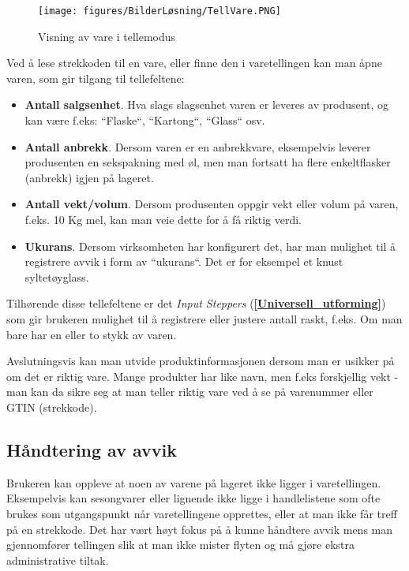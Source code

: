 \begin{figure}[H] 
    \centering
    \texttt{[image: figures/BilderLøsning/TellVare.PNG]}
    \caption{Visning av vare i tellemodus}
\end{figure}

Ved å lese strekkoden til en vare, eller finne den i varetellingen kan man åpne varen, som gir tilgang til tellefeltene:

\begin{itemize}
    \item \textbf{Antall salgsenhet}. Hva slags slagsenhet varen er leveres av produsent, og kan være f.eks: ``Flaske``, ``Kartong``, ``Glass`` osv.
    \item \textbf{Antall anbrekk}. Dersom varen er en anbrekkvare, eksempelvis leverer produsenten en sekspakning med øl, men man fortsatt ha flere enkeltflasker (anbrekk) igjen på lageret.
    \item \textbf{Antall vekt/volum}. Dersom produsenten oppgir vekt eller volum på varen, f.eks. 10 Kg mel, kan man veie dette for å få riktig verdi. 
    \item \textbf{Ukurans}. Dersom virksomheten har konfigurert det, har man mulighet til å registrere avvik i form av ``ukurans``. Det er for eksempel et knust syltetøyglass.
\end{itemize}

Tilhørende disse tellefeltene er det \textit{Input Steppers} (\textbf{\ref{Universell_utforming}}) som gir brukeren mulighet til å registrere eller justere antall raskt, f.eks. Om man bare har en eller to stykk av varen. 

Avslutningsvis kan man utvide produktinformasjonen dersom man er usikker på om det er riktig vare. Mange produkter har like navn, men f.eks forskjellig vekt - man kan da sikre seg at man teller riktig vare ved å se på varenummer eller GTIN (strekkode).




\subsection{\textbf{Håndtering av avvik}} \label{Avvik}
Brukeren kan oppleve at noen av varene på lageret ikke ligger i varetellingen. Eksempelvis kan sesongvarer eller lignende ikke ligge i handlelistene som ofte brukes som utgangspunkt når varetellingene opprettes, eller at man ikke får treff på en strekkode. Det har vært høyt fokus på å kunne håndtere avvik mens man gjennomfører tellingen slik at man ikke mister flyten og må gjøre ekstra administrative tiltak.

